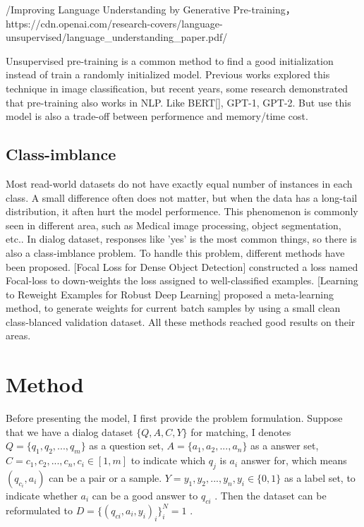 \documentclass{article}%
\begin{document}
%
/Improving Language Understanding by Generative Pre{-}training，https://cdn.openai.com/research{-}covers/language{-}unsupervised/language\_understanding\_paper.pdf/%

%
Unsupervised pre{-}training is a common method to find a good initialization instead of train a randomly initialized model. Previous works explored this technique in image classification, but recent years, some research demonstrated that pre{-}training also works in NLP. Like BERT{[}{]}, GPT{-}1, GPT{-}2. But use this model is also a trade{-}off between performence and memory/time cost.%

%
\subsection{Class{-}imblance}%

%
Most read{-}world datasets do not have exactly equal number of instances in each class. A small difference often does not matter, but when the data has a long{-}tail distribution, it aften hurt the model performence. This phenomenon is commonly seen in different area, such as Medical image processing, object segmentation, etc.. In dialog dataset, responses like 'yes' is the most common things, so there is also a class{-}imblance problem. To handle this problem, different methods have been proposed. {[}Focal Loss for Dense Object Detection{]} constructed a loss named Focal{-}loss to down{-}weights the loss assigned to well{-}classified examples. {[}Learning to Reweight Examples for Robust Deep Learning{]} proposed a meta{-}learning method, to generate weights for current batch samples by using a small clean class{-}blanced validation dataset. All these methods reached good results on their areas.%

%

%
\section{Method}%

%
Before presenting the model, I first provide the problem formulation. Suppose that we have a dialog dataset  $\{Q,A,C,Y\}$  for matching, I denotes  $Q=\{q_1,q_2,...,q_m\}$  as a question set,  $A=\{a_1,a_2,...,a_n\}$  as a answer set,  $C={c_1,c_2,...,c_n},c_i\in [1,m]$  to indicate which  $q_j$  is  $a_i$  answer for, which means  $\left( q_{c_i},a_i\right)$  can be a pair or a sample.  $Y={y_1,y_2,...,y_n},y_i\in\{0,1\}$  as a label set, to indicate whether  $a_i$  can be a good answer to  $q_{ci}$ . Then the dataset can be reformulated to  $D = \{\left(q_{ci},a_i,y_i\right)_i\}^N_i=1$ .%
\end{document}
